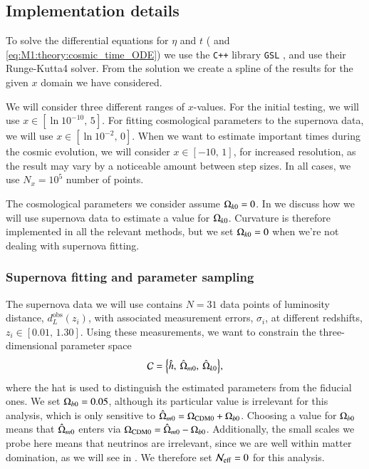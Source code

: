 
\subsection{Implementation details}\label{ssec:M1:implementations} 
To solve the differential equations for $\eta$ and $t$ ( and \eqref{eq:M1:theory:cosmic_time_ODE}) we use the \texttt{C++} library \texttt{GSL} \cite{gough2009gnu}, and use their Runge-Kutta4 solver. From the solution we create a spline of the results for the given $x$ domain we have considered. 

We will consider three different ranges of $x$-values. For the initial testing, we will use ${x\in[\ln 10^{-10},\,5]}$. For fitting cosmological parameters to the supernova data, we will use ${x\in[\ln 10^{-2},\,0]}$. When we want to estimate important times during the cosmic evolution, we will consider $x\in[-10,\,1]$, for increased resolution, as the result may vary by a noticeable amount between step sizes. In all cases, we use $N_x=10^5$ number of points.  

The cosmological parameters we consider assume $\Omega_{k0}=0$. In  we discuss how we will use supernova data to estimate a value for $\Omega_{k0}$. Curvature is therefore implemented in all the relevant methods, but we set $\Omega_{k0}=0$ when we're not dealing with supernova fitting.  

\subsubsection{Supernova fitting and parameter sampling}\label{sssec:M1:implementations:supernova_fitting}
The supernova data we will use contains $N=31$ data points of luminosity distance, $d_L^\mathrm{obs}(z_i)$, with associated measurement errors, $\sigma_i$, at different redshifts, $z_i\in[0.01,\,1.30]$. Using these measurements, we want to constrain the three-dimensional parameter space 
\begin{equation}
    \mathcal{C} = \Big\{ \hat{h},\: \hat{\Omega}_{m0},\: \hat{\Omega}_{k0} \Big\}, \label{eq:M1:implementations:supernova_parameter_space}
\end{equation}  
where the hat is used to distinguish the estimated parameters from the fiducial ones. We set $\Omega_{b0}=0.05$, although its particular value is irrelevant for this analysis, which is only sensitive to $\hat{\Omega}_{m0}=\Omega_\mathrm{CDM0}+\Omega_{b0}$. Choosing a value for $\Omega_{b0}$ means that $\hat{\Omega}_{m0}$ enters via $\Omega_\mathrm{CDM0}=\hat{\Omega}_{m0}-\Omega_{b0}$. Additionally, the small scales we probe here means that neutrinos are irrelevant, since we are well within matter domination, as we will see in . We therefore set $\mathcal{N}_\mathrm{eff}=0$ for this analysis. 

